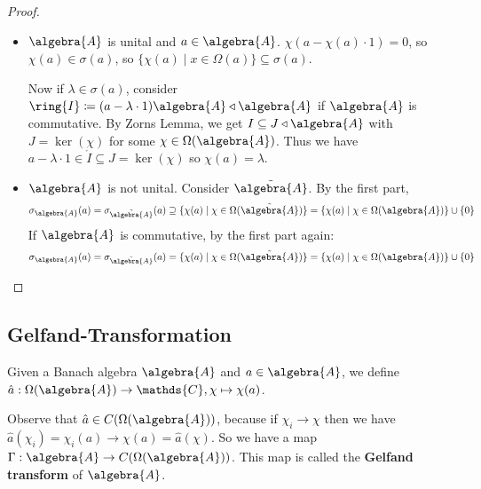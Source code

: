 \documentclass[a4paper]{article}
\begin{document}
\begin{proof}~
	\begin{itemize}
		\item $\algebra{A}$ is unital and $a \in \algebra{A}$. $\chi(a - \chi(a) \cdot 1) = 0$, so $\chi(a) \in \sigma(a)$, so $\{ \chi(a) \mid x \in \Omega(a) \}  \subseteq \sigma(a)$.

		      Now if $\lambda \in \sigma(a)$, consider $\ring{I} \coloneq (a - \lambda \cdot 1) \algebra{A} \triangleleft \algebra{A}$ if $\algebra{A}$ is commutative.
		      By Zorns Lemma, we get $I \subseteq J \triangleleft \algebra{A}$ with $J = \ker(\chi)$ for some $\chi \in \Omega(\algebra{A})$. Thus we have $a - \lambda \cdot 1 \in \ring{I} \subseteq J = \ker(\chi)$ so $\chi(a) = \lambda$.

		\item $\algebra{A}$ is not unital. Consider $\tilde{\algebra{A}}$. By the first part,
		      \begin{equation*}
			      \sigma_\algebra{A}(a) = \sigma_{\tilde{\algebra{A}}}(a) \supseteq \{\chi(a) \mid \chi \in \Omega(\tilde{\algebra{A}}) \} = \{\chi(a) \mid \chi \in \Omega(\algebra{A}) \} \cup \{0\}
		      \end{equation*}
		      If $\algebra{A}$ is commutative, by the first part again:
		      \begin{equation*}
			      \sigma_\algebra{A}(a) = \sigma_{\tilde{\algebra{A}}}(a) = \{\chi(a) \mid \chi \in \Omega(\tilde{\algebra{A}})\} = \{\chi(a) \mid \chi \in \Omega(\algebra{A}) \} \cup \{0\}
		      \end{equation*}
	\end{itemize}
\end{proof}

\subsection{Gelfand-Transformation}

\begin{definition}
	Given a Banach algebra $\algebra{A}$ and $a \in \algebra{A}$, we define $\hat a: \Omega(\algebra{A}) \to \mathds{C}, \chi \mapsto \chi(a)$.
\end{definition}

Observe that $\hat a \in C(\Omega(\algebra{A}))$, because if $\chi_i \to \chi$ then we have $\hat a(\chi_i) = \chi_i(a) \to \chi(a) = \hat a(\chi)$. So we have a map $\Gamma: \algebra{A} \to C(\Omega(\algebra{A}))$. This map is called the \textbf{Gelfand transform} of $\algebra{A}$.
\end{document}
